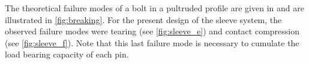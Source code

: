 
The theoretical failure modes of a bolt in a pultruded profile are given in \cite{Fiberline2003} and are illustrated in \cref{fig:breaking}. For the present design of the sleeve system, the observed failure modes were tearing (see \cref{fig:sleeve_e}) and contact compression (see \cref{fig:sleeve_f}). Note that this last failure mode is necessary to cumulate the load bearing capacity of each pin.



